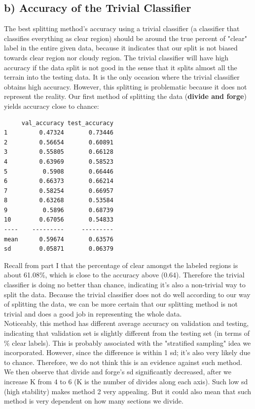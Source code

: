 \documentclass[jou]{apa}%
\begin{document}
\subsection{b) Accuracy of the Trivial Classifier}
The best splitting method's accuracy using a trivial classifier (a classifier that classifies everything as clear region) should be around the true percent of "clear" label in the entire given data, because it indicates that our split is not biased towards clear region nor cloudy region. The trivial classifier will have high accuracy if the data split is not good in the sense that it splits almost all the terrain into the testing data. It is the only occasion where the trivial classifier obtains high accuracy. However, this splitting is problematic because it does not represent the reality. Our first method of splitting the data (\textbf{divide and forge}) yields accuracy close to chance:
\begin{verbatim}
     val_accuracy test_accuracy
1         0.47324       0.73446
2         0.56654       0.60891
3         0.55805       0.66128
4         0.63969       0.58523
5          0.5908       0.66446
6         0.66373       0.66214
7         0.58254       0.66957
8         0.63268       0.53584
9          0.5896       0.68739
10        0.67056       0.54833
----    ---------     ---------
mean      0.59674       0.63576
sd        0.05871       0.06379
\end{verbatim}
Recall from part I that the percentage of clear amongst the labeled regions is about 61.08\%, which is close to the accuracy above (0.64). Therefore the trivial classifier is doing no better than chance, indicating it's also a non-trivial way to split the data. Because the trivial classifier does not do well according to our way of splitting the data, we can be more certain that our splitting method is not trivial and does a good job in representing the whole data.\\
\indent Noticeably, this method has different average accuracy on validation and testing, indicating that validation set is slightly different from the testing set (in terms of \% clear labels). This is probably associated with the "stratified sampling" idea we incorporated. However, since the difference is within 1 sd; it's also very likely due to chance. Therefore, we do not think this is an evidence against such method. We then observe that divide and forge's sd significantly decreased, after we increase K from 4 to 6 (K is the number of divides along each axis). Such low sd (high stability) makes method 2 very appealing. But it could also mean that such method is very dependent on how many sections we divide.
\end{document}
